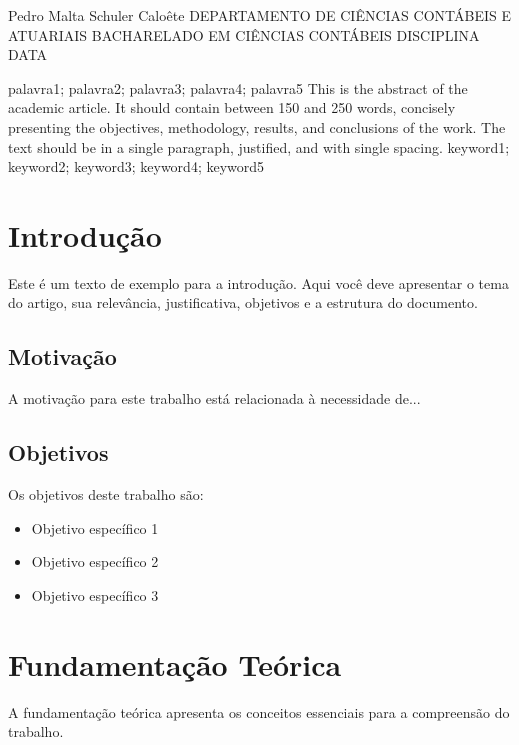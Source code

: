 \documentclass{ufpe-article}
\begin{document}
{Pedro Malta Schuler Caloête}
{DEPARTAMENTO DE CIÊNCIAS CONTÁBEIS E ATUARIAIS}
{BACHARELADO EM CIÊNCIAS CONTÁBEIS}
{DISCIPLINA}
{DATA}

\ufpetoc

{palavra1; palavra2; palavra3; palavra4; palavra5}
{This is the abstract of the academic article. It should contain between 150 and 250 words, concisely presenting the objectives, methodology, results, and conclusions of the work. The text should be in a single paragraph, justified, and with single spacing.}
{keyword1; keyword2; keyword3; keyword4; keyword5}

\ufpestartcontent

\section{Introdução}
Este é um texto de exemplo para a introdução. Aqui você deve apresentar o tema do artigo, sua relevância, justificativa, objetivos e a estrutura do documento.

\subsection{Motivação}
A motivação para este trabalho está relacionada à necessidade de...

\subsection{Objetivos}
Os objetivos deste trabalho são:
\begin{itemize}
	\item Objetivo específico 1
	\item Objetivo específico 2
	\item Objetivo específico 3
\end{itemize}

\section{Fundamentação Teórica}
A fundamentação teórica apresenta os conceitos essenciais para a compreensão do trabalho.
\end{document}
